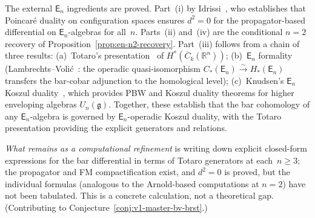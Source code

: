 \begin{remark}\label{rem:en-scope}
The external $\mathsf{E}_n$ ingredients are proved. Part~(i) by
Idrissi~\cite{Idrissi22}, who establishes that Poincar\'e duality on
configuration spaces ensures $d^2 = 0$ for the propagator-based
differential on $\mathsf{E}_n$-algebras for all~$n$. Parts~(ii)
and~(iv) are the conditional $n=2$ recovery of
Proposition~\ref{prop:en-n2-recovery}. Part~(iii)
follows from a chain of three results: (a)~Totaro's
presentation~\cite{Totaro96} of
$H^*(\overline{C}_k(\mathbb{R}^n))$; (b)~$\mathsf{E}_n$ formality
(Lambrechts--Voli\'c~\cite{LambrechtsVolic14}: the operadic
quasi-isomorphism $C_*(\mathsf{E}_n) \xrightarrow{\sim}
H_*(\mathsf{E}_n)$ transfers the bar-cobar adjunction to the
homological level); (c)~Knudsen's $\mathsf{E}_n$ Koszul
duality~\cite{Knudsen18}, which provides PBW and Koszul duality
theorems for higher enveloping algebras $U_n(\mathfrak{g})$.
Together, these establish that the bar cohomology of any
$\mathsf{E}_n$-algebra is governed by $\mathsf{E}_n$-operadic Koszul
duality, with the Totaro presentation providing the explicit
generators and relations.

\emph{What remains as a computational refinement} is writing down
explicit closed-form expressions for the bar differential in terms of
Totaro generators at each~$n \geq 3$; the propagator and FM
compactification exist, and $d^2 = 0$ is proved, but the individual
formulas (analogous to the Arnold-based computations at $n = 2$) have
not been tabulated. This is a concrete calculation, not a
theoretical gap.
(Contributing to Conjecture~\ref{conj:v1-master-bv-brst}.)
\end{remark}

